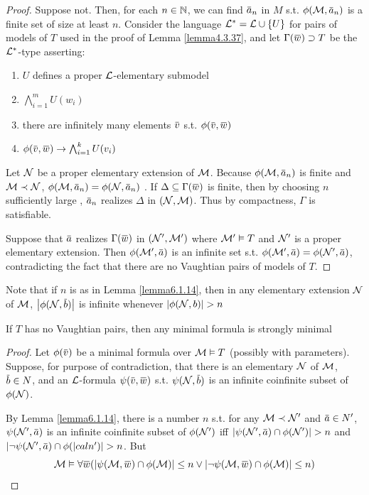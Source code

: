 \documentclass[11pt]{article}
\begin{document}
\begin{proof}
Suppose not. Then, for each \(n\in\mathbb{N}\), we can find \(\bara_n\) in \(M\) s.t. \(\phi(\calm,\bara_n)\) is a
finite set of size at least \(n\). Consider the language \(\mathcal{L}^*=\mathcal{L}\cup\{U\}\) for pairs of models
of \(T\) used in the proof of Lemma \ref{lemma4.3.37}, and let \(\Gamma(\barw)\supset T\) be the \(\mathcal{L}^*\)-type
asserting:
\begin{enumerate}
\item \(U\) defines a proper \(\mathcal{L}\)-elementary submodel
\item \(\bigwedge_{i=1}^mU(w_i)\)
\item there are infinitely many elements \(\barv\) s.t. \(\phi(\barv,\barw)\)
\item \(\phi(\barv,\barw)\to\bigwedge_{i=1}^kU(v_i)\)
\end{enumerate}


Let \(\mathcal{N}\) be a proper elementary extension of \(\mathcal{M}\). Because \(\phi(\calm,\bara_n)\) is finite
and \(\mathcal{M}\prec\mathcal{N}\), \(\phi(\calm,\bara_n)=\phi(\caln,\bara_n)\)
. If \(\Delta\subseteq\Gamma(\barw)\) is finite, then by choosing \(n\)
sufficiently large
, \(\bara_n\) realizes \(\Delta\) in \((\mathcal{N},\mathcal{M})\). Thus by compactness, \(\Gamma\) is satisfiable.

Suppose that \(\bara\) realizes \(\Gamma(\barw)\) in \((\mathcal{N}',\mathcal{M}')\) where \(\mathcal{M}'\vDash T\) and \(\mathcal{N}'\) is a
proper elementary extension.
Then \(\phi(\calm',\bara)\) is an infinite set s.t. \(\phi(\calm',\bara)=\phi(\caln',\bara)\), contradicting the fact
that there are no Vaughtian pairs of models of \(T\).
\end{proof}

Note that if \(n\) is as in Lemma \ref{lemma6.1.14}, then in any elementary extension \(\mathcal{N}\)
of \(\mathcal{M}\), \(\abs{\phi(\caln,\barb)}\) is infinite whenever \(\abs{\phi(\caln,b)}>n\)

\begin{corollary}[]
\label{cor6.1.15}
If \(T\) has no Vaughtian pairs, then any minimal formula is strongly minimal
\end{corollary}

\begin{proof}
Let \(\phi(\barv)\) be a minimal formula over \(\mathcal{M}\vDash T\) (possibly with parameters). Suppose, for
purpose of contradiction, that there is an elementary \(\mathcal{N}\) of \(\mathcal{M}\), \(\barb\in N\), and
an \(\mathcal{L}\)-formula \(\psi(\barv,\barw)\) s.t. \(\psi(\caln,\barb)\) is an infinite coinfinite subset
of \(\phi(\mathcal{N})\).

By Lemma \ref{lemma6.1.14}, there is a number \(n\) s.t. for any \(\mathcal{M}\prec\mathcal{N}'\)
and \(\bara\in N'\), \(\psi(\caln',\bara)\) is an infinite coinfinite subset of \(\phi(\mathcal{N}')\)
iff \(\abs{\psi(\caln',\bara)\cap\phi(\caln')}>n\) and \(\abs{\neg\psi(\caln',\bara)\cap\phi(|caln')}>n\). But
\begin{equation*}
\calm\vDash\forall\barw(\abs{\psi(\calm,\barw)\cap\phi(\calm)}\le n\vee\abs{\neg\psi(\calm,\barw)\cap\phi(\calm)}\le n)
\end{equation*}
\end{proof}
\end{document}

